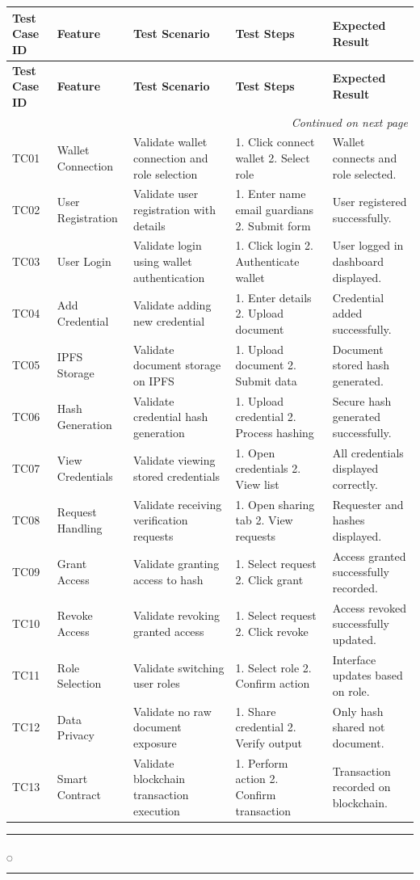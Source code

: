 \begin{longtable}{|p{1.1cm}|p{2cm}|p{2.5cm}|p{3cm}|p{3cm}|}
\hline
\textbf{Test Case ID} & \textbf{Feature} & \textbf{Test Scenario} & \textbf{Test Steps} & \textbf{Expected Result} \\
\hline
\endfirsthead

\hline
\textbf{Test Case ID} & \textbf{Feature} & \textbf{Test Scenario} & \textbf{Test Steps} & \textbf{Expected Result} \\
\hline
\endhead

\hline \multicolumn{5}{r}{\emph{Continued on next page}} \\
\endfoot

\hline
\endlastfoot

TC01 & Wallet Connection & Validate wallet connection and role selection & 1. Click connect wallet 2. Select role & Wallet connects and role selected. \\
\hline
TC02 & User Registration & Validate user registration with details & 1. Enter name email guardians 2. Submit form & User registered successfully. \\
\hline
TC03 & User Login & Validate login using wallet authentication & 1. Click login 2. Authenticate wallet & User logged in dashboard displayed. \\
\hline
TC04 & Add Credential & Validate adding new credential & 1. Enter details 2. Upload document & Credential added successfully. \\
\hline
TC05 & IPFS Storage & Validate document storage on IPFS & 1. Upload document 2. Submit data & Document stored hash generated. \\
\hline
TC06 & Hash Generation & Validate credential hash generation & 1. Upload credential 2. Process hashing & Secure hash generated successfully. \\
\hline
TC07 & View Credentials & Validate viewing stored credentials & 1. Open credentials 2. View list & All credentials displayed correctly. \\
\hline
TC08 & Request Handling & Validate receiving verification requests & 1. Open sharing tab 2. View requests & Requester and hashes displayed. \\
\hline
TC09 & Grant Access & Validate granting access to hash & 1. Select request 2. Click grant & Access granted successfully recorded. \\
\hline
TC10 & Revoke Access & Validate revoking granted access & 1. Select request 2. Click revoke & Access revoked successfully updated. \\
\hline
TC11 & Role Selection & Validate switching user roles & 1. Select role 2. Confirm action & Interface updates based on role. \\
\hline
TC12 & Data Privacy & Validate no raw document exposure & 1. Share credential 2. Verify output & Only hash shared not document. \\
\hline
TC13 & Smart Contract & Validate blockchain transaction execution & 1. Perform action 2. Confirm transaction & Transaction recorded on blockchain. \\
\hline
\end{longtable}

\rule{0.49\textwidth}{0.75pt} $_{\bigcirc}$ \rule{0.49\textwidth}{0.75pt}\\



